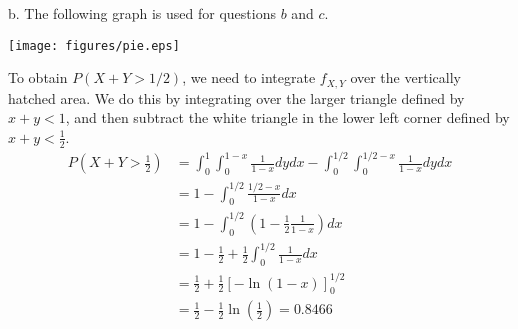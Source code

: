 \begin{exercise}
\begin{solution}
b.         The following graph is used for questions $b$ and $c$.
        \begin{center}
            \texttt{[image: figures/pie.eps]}
        \end{center}
        To obtain $P(X+Y>1/2)$, we need to integrate $f_{X,Y}$ over the vertically hatched area. We do this by integrating over the larger triangle defined by $x+y<1$, and then subtract the white triangle in the lower left corner defined by $x+y<\frac{1}{2}$.
        \begin{align*}
            P\left(X+Y>\frac{1}{2}\right) &= \int_{0}^{1}\int_{0}^{1-x}\frac{1}{1-x}dydx - \int_{0}^{1/2}\int_{0}^{1/2-x}\frac{1}{1-x}dydx\\
            & = 1-\int_{0}^{1/2}\frac{1/2-x}{1-x}dx\\
            & = 1-\int_{0}^{1/2}\left(1-\frac{1}{2}\frac{1}{1-x}\right)dx\\
            & = 1-\frac{1}{2} + \frac{1}{2}\int_{0}^{1/2}\frac{1}{1-x}dx\\
            & = \frac{1}{2}+\frac{1}{2}\left[-\ln(1-x)\right]^{1/2}_{0}\\
            & = \frac{1}{2}-\frac{1}{2}\ln\left(\frac{1}{2}\right)=0.8466
        \end{align*}



\end{solution}
\end{exercise}
